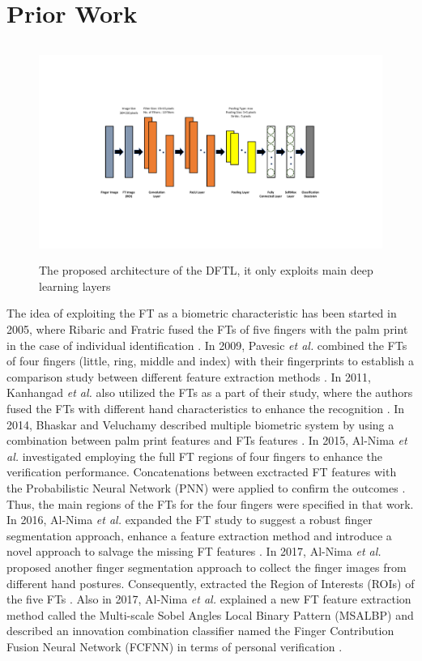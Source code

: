 \documentclass[conference]{IEEEtran}
\begin{document}
\section{Prior Work}
\begin{figure}[!t]
    \centering
    \includegraphics[page=1,height=7cm,width=20cm,trim=5cm 4cm 3cm 4cm,clip]{DFTL.pdf}
    \caption{The proposed architecture of the DFTL, it only exploits main deep learning layers}
    \label{fig:DFTL}
\end{figure}
The idea of exploiting the FT as a biometric characteristic has been started in 2005, where Ribaric and Fratric fused the FTs of five fingers with the palm print in the case of individual identification \cite{Ribaric2005ABiometric}. In 2009, Pavesic \textit{et al.} combined the FTs of four fingers (little, ring, middle and index) with their fingerprints to establish a comparison study between different feature extraction methods \cite{Pavesic2009Finger-based}. In 2011, Kanhangad \textit{et al.} also utilized the FTs as a part of their study, where the authors fused the FTs with different hand characteristics to enhance the recognition \cite{Kanhangad2011AUnified}. In 2014, Bhaskar and Veluchamy described multiple biometric system by using a combination between palm print features and FTs features \cite{Bhaskar2014Hand}. In 2015, Al-Nima \textit{et al.} investigated employing the full FT regions of four fingers to enhance the verification performance. Concatenations between exctracted FT features with the Probabilistic Neural Network (PNN) were applied to confirm the outcomes \cite{Al-Nima2015Human}. Thus, the main regions of the FTs for the four fingers were specified in that work. In 2016, Al-Nima \textit{et al.} expanded the FT study to suggest a robust finger segmentation approach, enhance a feature extraction method and introduce a novel approach to salvage the missing FT features \cite{Al-Nima2016Robust}. In 2017, Al-Nima \textit{et al.} proposed another finger segmentation approach to collect the finger images from different hand postures. Consequently, extracted the Region of Interests (ROIs) of the five FTs \cite{Al-Nima2017efficient}. Also in 2017, Al-Nima \textit{et al.} explained a new FT feature extraction method called the Multi-scale Sobel Angles Local Binary Pattern (MSALBP) and described an innovation combination classifier named the Finger Contribution Fusion Neural Network (FCFNN) in terms of personal verification \cite{Al-Nima2017finger}. \\
\end{document}
